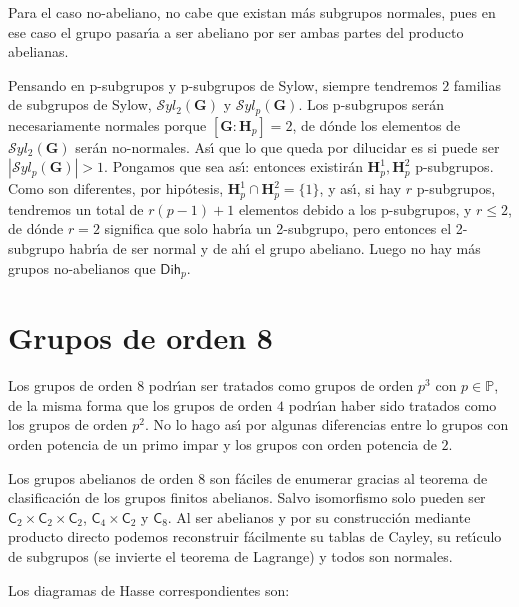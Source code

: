 \documentclass[final,12pt,a4paper,twoside,fleqn]{extbook}
\newcommand{\setP}{\ensuremath{}\mathbb{P}}
\newcommand{\grG}{\ensuremath{\mathbf{G}}}
\newcommand{\grH}{\ensuremath{\mathbf{H}}}
\newcommand{\grclass}[1]{\ensuremath{\mathsf{#1}}}
\newcommand{\cyclicgr}[1]{\ensuremath{{\grclass{C}}_{#1}}}
\newcommand{\dihgr}[1]{\ensuremath{{\grclass{Dih}}_{#1}}}
\theoremstyle{definition}
\theoremstyle{remark}
\begin{document}
    Para el caso no-abeliano, no cabe que existan m\'as subgrupos normales, pues en ese caso el grupo pasar{\'{\i}}a a
    ser abeliano por ser ambas partes del producto abelianas.

    Pensando en p-subgrupos y p-subgrupos de Sylow, siempre tendremos $2$ familias de subgrupos de Sylow,
    $\mathcal{S}yl_2 (\grG)$ y $\mathcal{S}yl_p (\grG)$. Los p-subgrupos ser\'an necesariamente normales porque $[\grG:\grH_p]=2$,
    de d\'onde los elementos de $\mathcal{S}yl_2 (\grG)$ ser\'an no-normales. As{\'{\i}} que lo que queda por dilucidar
    es si puede ser $\left|\mathcal{S}yl_{p}(\grG)\right|>1$. Pongamos que sea as{\'{\i}}: entonces existir\'an
    $\grH_p^1,\grH_p^2$ p-subgrupos. Como son diferentes, por hip\'otesis, $\grH_p^1       \cap \grH_p^2 = \{1\}$, y as{\'{\i}},
    si hay $r$ p-subgrupos, tendremos un total de $r(p-1)+1$ elementos debido a los p-subgrupos, y $r       \le 2$,
    de d\'onde $r=2$ significa que solo habr{\'{\i}}a un 2-subgrupo, pero entonces el 2-subgrupo habr{\'{\i}}a
    de ser normal y de ah{\'{\i}} el grupo abeliano. Luego no hay m\'as grupos no-abelianos que ${\dihgr{p}}$.

    \chapter{Grupos de orden 8}

    Los grupos de orden $8$ podr{\'{\i}}an ser tratados como grupos de orden $p^3$ con $p       \in \setP$, de la misma forma que
    los grupos de orden $4$ podr{\'{\i}}an haber sido tratados como los grupos de orden $p^2$. No lo hago as{\'{\i}} por
    algunas diferencias entre lo grupos con orden potencia de un primo impar y los grupos con orden potencia de $2$.

    Los grupos abelianos de orden $8$ son f\'aciles de enumerar gracias al teorema de clasificaci\'on de los grupos finitos
    abelianos. Salvo isomorfismo solo pueden ser $\cyclicgr{2}      \times      \cyclicgr{2}      \times      \cyclicgr{2}$, $\cyclicgr{4}      \times      \cyclicgr{2}$ y $\cyclicgr{8}$.
    Al ser abelianos y por su construcci\'on mediante producto directo podemos reconstruir f\'acilmente su tablas de Cayley,
    su ret{\'{\i}}culo de subgrupos (se invierte el teorema de Lagrange) y todos son normales.

    Los diagramas de Hasse correspondientes son:
\end{document}
